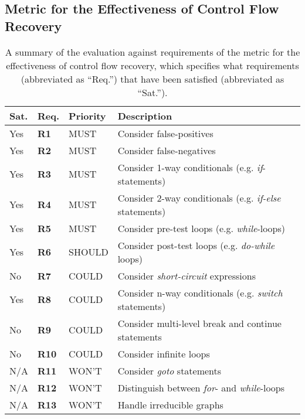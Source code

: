 
\subsection{Metric for the Effectiveness of Control Flow Recovery}
\label{sec:cfa_metric}



\begin{table}[htbp]
	\begin{center}
		\begin{tabular}{|l|l|l|l|}
			\hline
			Sat. & Req. & Priority & Description \\
			\hline
			\rowcolor{light_green_3}
			Yes & \textbf{R1} & MUST & Consider false-positives \\
			\rowcolor{light_green_3}
			Yes & \textbf{R2} & MUST & Consider false-negatives \\
			\rowcolor{light_green_3}
			Yes & \textbf{R3} & MUST & Consider 1-way conditionals (e.g. \textit{if}-statements) \\
			\rowcolor{light_green_3}
			Yes & \textbf{R4} & MUST & Consider 2-way conditionals (e.g. \textit{if-else} statements) \\
			\rowcolor{light_green_3}
			Yes & \textbf{R5} & MUST & Consider pre-test loops (e.g. \textit{while}-loops) \\
			\hline
			\rowcolor{light_green_3}
			Yes & \textbf{R6} & SHOULD & Consider post-test loops (e.g. \textit{do-while} loops) \\
			\hline
			\rowcolor{light_red_3}
			No & \textbf{R7} & COULD & Consider \textit{short-circuit} expressions \\
			\rowcolor{light_green_3}
			Yes & \textbf{R8} & COULD & Consider n-way conditionals (e.g. \textit{switch} statements) \\
			\rowcolor{light_red_3}
			No & \textbf{R9} & COULD & Consider multi-level break and continue statements \\
			\rowcolor{light_red_3}
			No & \textbf{R10} & COULD & Consider infinite loops \\
			\hline
			N/A & \textbf{R11} & WON'T & Consider \textit{goto} statements \\
			N/A & \textbf{R12} & WON'T & Distinguish between \textit{for}- and \textit{while}-loops \\
			N/A & \textbf{R13} & WON'T & Handle irreducible graphs \\
			\hline
		\end{tabular}
	\end{center}
	\caption{A summary of the evaluation against requirements of the metric for the effectiveness of control flow recovery, which specifies what requirements (abbreviated as ``Req.'') that have been satisfied (abbreviated as ``Sat.'').}
	\label{tbl:eval_summary_of_metric}
\end{table}
